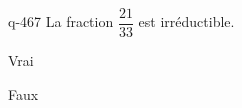 \begin{truefalse}{q-467}
La fraction $\dfrac{21}{33}$ est irréductible.
\item Vrai
\item* Faux
\end{truefalse}

